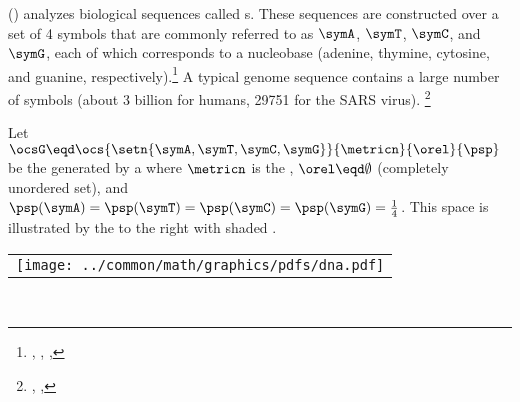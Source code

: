 \begin{tabstr}{0.75}
%
%
\begin{example}
\label{ex:dna}
 () analyzes biological sequences called s.
These sequences are constructed over a set of 4 symbols that are commonly referred to as 
$\symA$, $\symT$, $\symC$, and $\symG$,
each of which corresponds to a nucleobase (adenine,  thymine, cytosine, and guanine, 
respectively).\footnote{
  ,
  ,
  ,
  }
A typical genome sequence contains a large number of symbols 
(about 3 billion for humans, 29751 for the SARS virus).%
\footnote{%
  ,
  ,
  }
\\[0.3ex]\begin{minipage}{\tw-37mm}%
Let $\ocsG\eqd\ocs{\setn{\symA,\symT,\symC,\symG}}{\metricn}{\orel}{\psp}$ 
be the   generated by a 
where $\metricn$ is the  ,
$\orel\eqd\emptyset$ (completely unordered set), and 
$\psp(\symA)=\psp(\symT)=\psp(\symC)=\psp(\symG)=\frac{1}{4}$.
This space is illustrated by the   to the right
with shaded  .
\end{minipage}%
\hfill%
{\begin{tabular}{c}%
  \gsize%
  \psset{unit=8mm}%
  \centering%
  {\texttt{[image: ../common/math/graphics/pdfs/dna.pdf]}}%
\end{tabular}}
\\

\end{example}
\end{tabstr}
